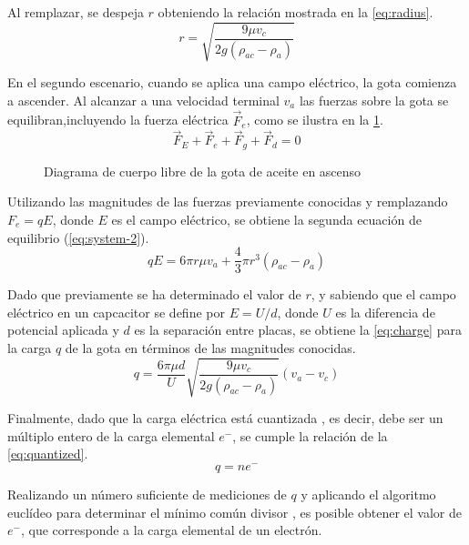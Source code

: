 Al remplazar, se despeja \( r \) obteniendo la relación mostrada en la
\cref{eq:radius}.
\begin{equation}\label{eq:radius}
    r = \sqrt{\frac{9\mu v_c}{2g(\rho_{ac}-\rho_a)}}
\end{equation}

En el segundo escenario, cuando se aplica una campo eléctrico, la gota comienza
a ascender.
Al alcanzar a una velocidad terminal $v_a$ las fuerzas sobre la gota se
equilibran,incluyendo la fuerza eléctrica \(\vec{F}_e\), como se ilustra en la
\cref{fig:fbd-ascending-drop}.
\begin{equation}
    \vec{F}_E + \vec{F}_e + \vec{F}_g + \vec{F}_d = 0
\end{equation}

\begin{figure}
    \centering
    \caption{Diagrama de cuerpo libre de la gota de aceite en ascenso}
    \label{fig:fbd-ascending-drop}
\end{figure}

Utilizando las magnitudes de las fuerzas previamente conocidas y remplazando
\(F_e=qE \), donde $E$ es el campo eléctrico, se obtiene la segunda ecuación de
equilibrio (\cref{eq:system-2}).
\begin{equation}\label{eq:system-2}
    qE = 6\pi r\mu v_a + \frac{4}{3}\pi r^3(\rho_{ac}-\rho_a)
\end{equation}

Dado que previamente se ha determinado el valor de \(r\), y sabiendo que el campo
eléctrico en un capcacitor se define por \( E = U / d \), donde $U$ es la
diferencia de potencial aplicada y $d$ es la separación entre placas, se obtiene
la \cref{eq:charge} para la carga \(q\) de la gota en términos de las magnitudes
conocidas.
\begin{equation}\label{eq:charge}
    q = \frac{6\pi \mu d}{U}\sqrt{\frac{9\mu v_c}{2g(\rho_{ac}-\rho_a)}}(v_a-v_c)
\end{equation}

Finalmente, dado que la carga eléctrica está cuantizada \cite{}, es decir,
debe ser un múltiplo entero de la carga elemental \(e^{-}\), se cumple la
relación de la \cref{eq:quantized}.
\begin{equation}\label{eq:quantized}
    q=ne^-
\end{equation}

Realizando un número suficiente de mediciones de \(q\) y aplicando el algoritmo
euclídeo para determinar el mínimo común divisor \cite{}, es posible obtener el
valor de \(e^{-}\), que corresponde a la carga elemental de un electrón.
